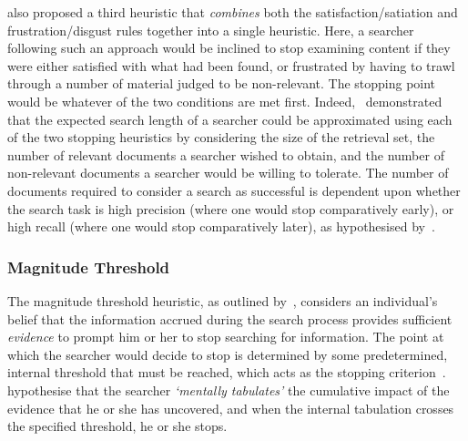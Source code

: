 \cite{kraft1979stopping_rules} also proposed a third heuristic that \emph{combines} both the satisfaction/satiation and frustration/disgust rules together into a single heuristic. Here, a searcher following such an approach would be inclined to stop examining content if they were either satisfied with what had been found, or frustrated by having to trawl through a number of material judged to be non-relevant. The stopping point would be whatever of the two conditions are met first. Indeed,~\cite{kraft1979stopping_rules} demonstrated that the expected search length of a searcher could be approximated using each of the two stopping heuristics by considering the size of the retrieval set, the number of relevant documents a searcher wished to obtain, and the number of non-relevant documents a searcher would be willing to tolerate. The number of documents required to consider a search as successful is dependent upon whether the search task is high precision (where one would stop comparatively early), or high recall (where one would stop comparatively later), as hypothesised by~\cite{bates1984thirty_items}.

\subsubsection{Magnitude Threshold}\label{sec:stopping_background:heuristics:judgement:magnitude}
The magnitude threshold heuristic, as outlined by~\citep{nickles1995judgment}, considers an individual's belief that the information accrued during the search process provides sufficient \emph{evidence} to prompt him or her to stop searching for information. The point at which the searcher would decide to stop is determined by some predetermined, internal threshold that must be reached, which acts as the stopping criterion~\citep{wald1948sequential_analysis, nickles1995judgment}.~\cite{gettys1979hypothesis} hypothesise that the searcher \emph{`mentally tabulates'} the cumulative impact of the evidence that he or she has uncovered, and when the internal tabulation crosses the specified threshold, he or she stops.

